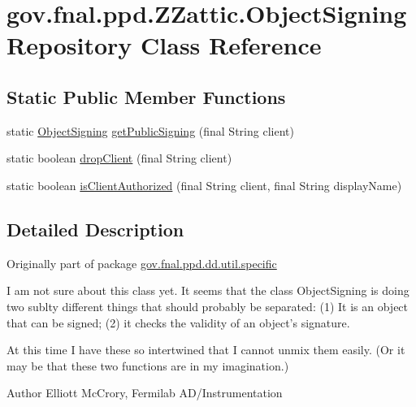 \hypertarget{classgov_1_1fnal_1_1ppd_1_1ZZattic_1_1ObjectSigningRepository}{\section{gov.\-fnal.\-ppd.\-Z\-Zattic.\-Object\-Signing\-Repository Class Reference}
\label{classgov_1_1fnal_1_1ppd_1_1ZZattic_1_1ObjectSigningRepository}
}
\subsection*{Static Public Member Functions}
\begin{DoxyCompactItemize}
\item 
static \hyperlink{classgov_1_1fnal_1_1ppd_1_1dd_1_1util_1_1specific_1_1ObjectSigning}{Object\-Signing} \hyperlink{classgov_1_1fnal_1_1ppd_1_1ZZattic_1_1ObjectSigningRepository_a31ab6187801d84bcca86ed9f27b40b25}{get\-Public\-Signing} (final String client)
\item 
static boolean \hyperlink{classgov_1_1fnal_1_1ppd_1_1ZZattic_1_1ObjectSigningRepository_ac6edbb6827da5d7a38b300ff0b7c71ef}{drop\-Client} (final String client)
\item 
static boolean \hyperlink{classgov_1_1fnal_1_1ppd_1_1ZZattic_1_1ObjectSigningRepository_aa45d975901673989670fe0010a8bdbba}{is\-Client\-Authorized} (final String client, final String display\-Name)
\end{DoxyCompactItemize}


\subsection{Detailed Description}
Originally part of package \hyperlink{namespacegov_1_1fnal_1_1ppd_1_1dd_1_1util_1_1specific}{gov.\-fnal.\-ppd.\-dd.\-util.\-specific} 

I am not sure about this class yet. It seems that the class Object\-Signing is doing two sublty different things that should probably be separated\-: (1) It is an object that can be signed; (2) it checks the validity of an object's signature. 

At this time I have these so intertwined that I cannot unmix them easily. (Or it may be that these two functions are in my imagination.) 

\begin{DoxyAuthor}{Author}
Elliott Mc\-Crory, Fermilab A\-D/\-Instrumentation 
\end{DoxyAuthor}


